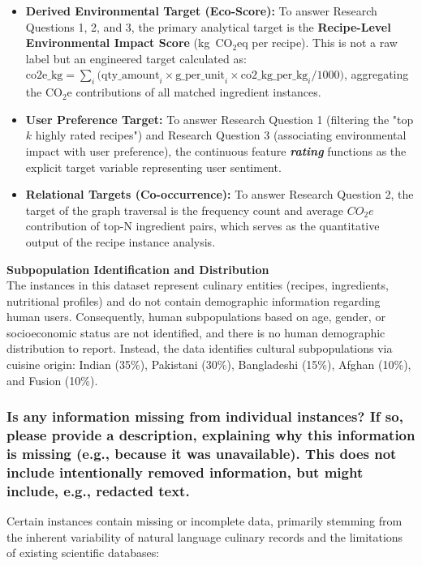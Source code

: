\documentclass{article}
\newcommand{\question}[1]{#1}
\begin{document}
\begin{itemize}
    \item \textbf{Derived Environmental Target (Eco-Score):} To answer Research Questions
    1, 2, and 3, the primary analytical target is the \textbf{Recipe-Level Environmental
    Impact Score} (kg~CO$_2$eq per recipe). This is not a raw label but an engineered
    target calculated as:
    $\text{co2e\_kg} = \sum_{i} \bigl(\text{qty\_amount}_i \times \text{g\_per\_unit}_i
    \times \text{co2\_kg\_per\_kg}_i / 1000 \bigr)$,
    aggregating the CO$_2$e contributions of all matched ingredient instances.
    \item \textbf{User Preference Target:} To answer Research Question 1 (filtering the "top $k$ highly rated recipes") and Research Question 3 (associating environmental impact with user preference), the continuous feature \textbf{\textit{rating}} functions as the explicit target variable representing user sentiment.
    \item \textbf{Relational Targets (Co-occurrence):} To answer Research Question 2, the target of the graph traversal is the frequency count and average $CO_2e$ contribution of top-N ingredient pairs, which serves as the quantitative output of the recipe instance analysis.
\end{itemize}

\textbf{Subpopulation Identification and Distribution} \\
The instances in this dataset represent culinary entities (recipes, ingredients, nutritional profiles) and do not contain demographic information regarding human users. Consequently, human subpopulations based on age, gender, or socioeconomic status are not identified, and there is no human demographic distribution to report. Instead, the data identifies cultural subpopulations via cuisine origin: Indian
(35\%), Pakistani (30\%), Bangladeshi (15\%), Afghan (10\%), and Fusion (10\%).


\question{\subsubsection*{Is any information missing from individual instances? If so, please provide a description, explaining why this information is missing (e.g., because it was unavailable). This does not include intentionally removed information, but might include, e.g., redacted text.}}

Certain instances contain missing or incomplete data, primarily stemming from the inherent variability of natural language culinary records and the limitations of existing scientific databases:
\end{document}
